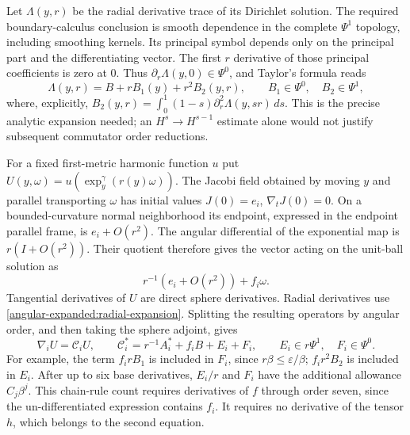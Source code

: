 \documentclass[11pt]{article}
\theoremstyle{definition}
\theoremstyle{remark}
\numberwithin{equation}{section}
\begin{document}
Let $\Lambda(y,r)$ be the radial derivative trace of its Dirichlet solution.
The required boundary-calculus conclusion is smooth dependence in the
complete $\Psi^1$ topology, including smoothing kernels.  Its principal
symbol depends only on the principal part and the differentiating vector.
The first $r$ derivative of those principal coefficients is zero at $0$.
Thus $\partial_r\Lambda(y,0)\in\Psi^0$, and Taylor's formula reads
\begin{equation}\label{angular-expanded:radial-expansion}
 \Lambda(y,r)=B+r B_1(y)+r^2 B_2(y,r),\qquad
 B_1\in\Psi^0,\quad B_2\in\Psi^1,
\end{equation}
where, explicitly,
$B_2(y,r)=\int_0^1(1-s)\partial_r^2\Lambda(y,sr)\,ds$.
This is the precise analytic expansion needed; an $H^s\to H^{s-1}$
estimate alone would not justify subsequent commutator order reductions.

For a fixed first-metric harmonic function $u$ put
$U(y,\omega)=u(\exp_y^\gamma(r(y)\omega))$.
The Jacobi field obtained by moving $y$ and parallel transporting $\omega$
has initial values $J(0)=e_i$, $\nabla_tJ(0)=0$.  On a bounded-curvature
normal neighborhood its endpoint, expressed in the endpoint parallel frame,
is $e_i+O(r^2)$.  The angular differential of the exponential map is
$r(I+O(r^2))$.  Their quotient therefore gives the vector acting on the
unit-ball solution as
\[
 r^{-1}(e_i+O(r^2))+f_i\omega.
\]
Tangential derivatives of $U$ are direct sphere derivatives.  Radial
derivatives use \eqref{angular-expanded:radial-expansion}.  Splitting the resulting
operators by angular order, and then taking the sphere adjoint, gives
\begin{equation}\label{angular-expanded:C-expansion}
 \nabla_iU=\mathcal C_iU,\qquad
 \mathcal C_i^*=r^{-1}A_i^*+f_iB+E_i+F_i,
 \qquad E_i\in r\Psi^1,\quad F_i\in\Psi^0.
\end{equation}
For example, the term $f_ir B_1$ is included in $F_i$, since
$r\beta\leq\varepsilon/\beta$; $f_ir^2B_2$ is included in $E_i$.
After up to six base derivatives, $E_i/r$ and $F_i$ have the additional
allowance $C_j\beta^j$.  This chain-rule count requires derivatives of $f$
through order seven, since the un-differentiated expression contains $f_i$.
It requires no derivative of the tensor $h$, which belongs to the second
equation.
\end{document}
